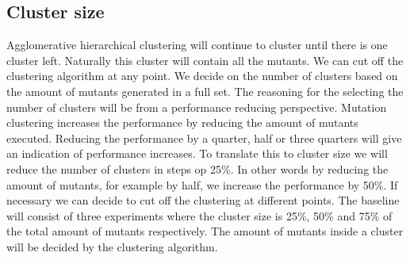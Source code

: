 \documentclass[../../main]{subfiles}
\begin{document}
\subsection{Cluster size}
Agglomerative hierarchical clustering will continue to cluster until there is one cluster left. 
Naturally this cluster will contain all the mutants.
We can cut off the clustering algorithm at any point.
We decide on the number of clusters based on the amount of mutants generated in a full set.
The reasoning for the selecting the number of clusters will be from a performance reducing perspective.
Mutation clustering increases the performance by reducing the amount of mutants executed\cite{Pizzoleto2019}.
Reducing the performance by a quarter, half or three quarters will give an indication of performance increases.
To translate this to cluster size we will reduce the number of clusters in steps op 25\%.
In other words by reducing the amount of mutants, for example by half, we increase the performance by 50\%\cite{Just2014}.
If necessary we can decide to cut off the clustering at different points.
The baseline will consist of three experiments where the cluster size is 25\%, 50\% and 75\% of the total amount of mutants respectively.
The amount of mutants inside a cluster will be decided by the clustering algorithm.
\end{document}
